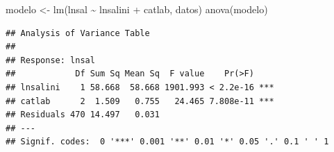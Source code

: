 \documentclass[
]{book}
\newenvironment{Shaded}{\begin{snugshade}}{\end{snugshade}}
\newcommand{\AttributeTok}[1]{\textcolor[rgb]{0.77,0.63,0.00}{#1}}
\newcommand{\DecValTok}[1]{\textcolor[rgb]{0.00,0.00,0.81}{#1}}
\newcommand{\FunctionTok}[1]{\textcolor[rgb]{0.00,0.00,0.00}{#1}}
\newcommand{\NormalTok}[1]{#1}
\newcommand{\OtherTok}[1]{\textcolor[rgb]{0.56,0.35,0.01}{#1}}
\newcommand{\SpecialCharTok}[1]{\textcolor[rgb]{0.00,0.00,0.00}{#1}}
\newcommand{\StringTok}[1]{\textcolor[rgb]{0.31,0.60,0.02}{#1}}
\theoremstyle{break}
\theoremstyle{nonumberplain}
\begin{document}
\begin{Shaded}
\begin{Highlighting}[]
\NormalTok{modelo }\OtherTok{\textless{}{-}} \FunctionTok{lm}\NormalTok{(lnsal }\SpecialCharTok{\textasciitilde{}}\NormalTok{ lnsalini }\SpecialCharTok{+}\NormalTok{ catlab, datos)}
\FunctionTok{anova}\NormalTok{(modelo)}
\end{Highlighting}
\end{Shaded}

\begin{verbatim}
## Analysis of Variance Table
## 
## Response: lnsal
##            Df Sum Sq Mean Sq  F value    Pr(>F)    
## lnsalini    1 58.668  58.668 1901.993 < 2.2e-16 ***
## catlab      2  1.509   0.755   24.465 7.808e-11 ***
## Residuals 470 14.497   0.031                       
## ---
## Signif. codes:  0 '***' 0.001 '**' 0.01 '*' 0.05 '.' 0.1 ' ' 1
\end{verbatim}

\begin{Shaded}
\end{Shaded}
\end{document}
